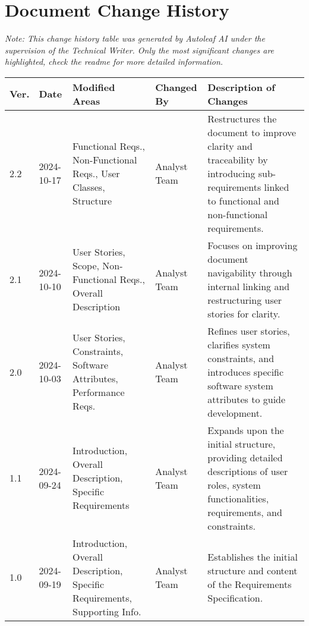\section{Document Change History}

\begin{center}
\small\textit{Note: This change history table was generated by Autoleaf AI under the supervision of the Technical Writer. Only the most significant changes are highlighted, check the readme for more detailed information.}

\vspace{0.5cm}

\begin{tabular}{|p{}|p{}|p{}|p{}|p{}|}
\hline
\textbf{Ver.} & \textbf{Date} & \textbf{Modified Areas} & \textbf{Changed By} & \textbf{Description of Changes} \\
\hline
2.2 & 2024-10-17 & Functional Reqs., Non-Functional Reqs., User Classes, Structure & Analyst Team &  Restructures the document to improve clarity and traceability by introducing sub-requirements linked to functional and non-functional requirements. \\
\hline
2.1 & 2024-10-10 & User Stories, Scope, Non-Functional Reqs., Overall Description & Analyst Team & Focuses on improving document navigability through internal linking and restructuring user stories for clarity. \\
\hline
2.0 & 2024-10-03 & User Stories, Constraints, Software Attributes, Performance Reqs. & Analyst Team & Refines user stories, clarifies system constraints, and introduces specific software system attributes to guide development. \\
\hline
1.1 & 2024-09-24 & Introduction, Overall Description, Specific Requirements & Analyst Team & Expands upon the initial structure, providing detailed descriptions of user roles, system functionalities, requirements, and constraints. \\
\hline
1.0 & 2024-09-19 &  Introduction, Overall Description, Specific Requirements, Supporting Info. & Analyst Team & Establishes the initial structure and content of the Requirements Specification. \\
\hline
\end{tabular}
\end{center}

\vspace{1cm} 
